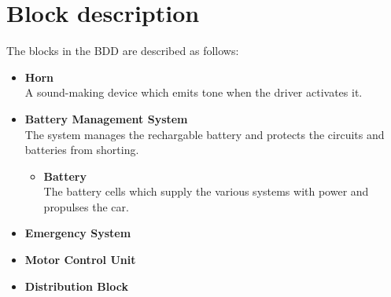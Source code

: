 \section{Block description}
The blocks in the BDD are described as follows:

\begin{itemize}
	\item \textbf{Horn}\\
	A sound-making device which emits tone when the driver activates it.
	\item \textbf{Battery Management System}\\
	The system manages the rechargable battery and protects the circuits and batteries from shorting.
	\begin{itemize}
		\item \textbf{Battery}\\
		The battery cells which supply the various systems with power and propulses the car.
	\end{itemize}
	\item \textbf{Emergency System}\\
	\item \textbf{Motor Control Unit}\\
	\item \textbf{Distribution Block}\\
\end{itemize}